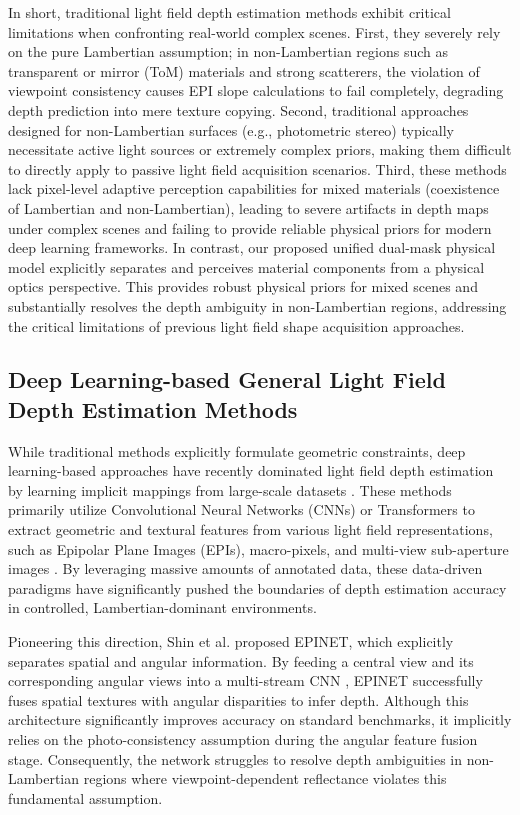 \documentclass[lettersize,journal]{IEEEtran}
\begin{document}
In short, traditional light field depth estimation methods exhibit critical limitations when confronting real-world complex scenes. First, they severely rely on the pure Lambertian assumption; in non-Lambertian regions such as transparent or mirror (ToM) materials and strong scatterers, the violation of viewpoint consistency causes EPI slope calculations to fail completely, degrading depth prediction into mere texture copying. Second, traditional approaches designed for non-Lambertian surfaces (e.g., photometric stereo) typically necessitate active light sources or extremely complex priors, making them difficult to directly apply to passive light field acquisition scenarios. Third, these methods lack pixel-level adaptive perception capabilities for mixed materials (coexistence of Lambertian and non-Lambertian), leading to severe artifacts in depth maps under complex scenes and failing to provide reliable physical priors for modern deep learning frameworks. In contrast, our proposed unified dual-mask physical model explicitly separates and perceives material components from a physical optics perspective. This provides robust physical priors for mixed scenes and substantially resolves the depth ambiguity in non-Lambertian regions, addressing the critical limitations of previous light field shape acquisition approaches.

\subsection{Deep Learning-based General Light Field Depth Estimation Methods}

While traditional methods explicitly formulate geometric constraints, deep learning-based approaches have recently dominated light field depth estimation by learning implicit mappings from large-scale datasets \cite{deepdeep}. These methods primarily utilize Convolutional Neural Networks (CNNs) or Transformers to extract geometric and textural features from various light field representations, such as Epipolar Plane Images (EPIs), macro-pixels, and multi-view sub-aperture images \cite{lightlight_18}. By leveraging massive amounts of annotated data, these data-driven paradigms have significantly pushed the boundaries of depth estimation accuracy in controlled, Lambertian-dominant environments.

Pioneering this direction, Shin et al. \cite{epinetepine} proposed EPINET, which explicitly separates spatial and angular information. By feeding a central view and its corresponding angular views into a multi-stream CNN \cite{multimulti}, EPINET successfully fuses spatial textures with angular disparities to infer depth. Although this architecture significantly improves accuracy on standard benchmarks, it implicitly relies on the photo-consistency assumption during the angular feature fusion stage. Consequently, the network struggles to resolve depth ambiguities in non-Lambertian regions where viewpoint-dependent reflectance violates this fundamental assumption.
\end{document}
